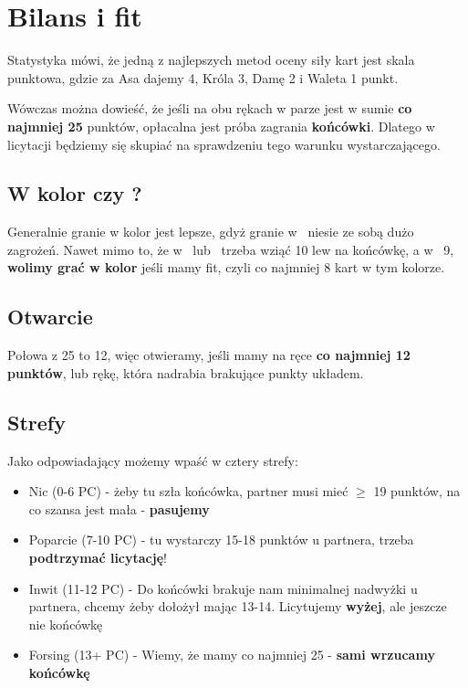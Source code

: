 \documentclass[12pt, a4paper]{article}
\begin{document}
    \pagebreak
    \section{Bilans i fit}

    Statystyka mówi, że jedną z najlepszych metod oceny siły kart jest skala punktowa,
    gdzie za Asa dajemy 4, Króla 3, Damę 2 i Waleta 1 punkt. 
    
    Wówczas można dowieść, że jeśli na obu rękach w parze jest w sumie \textbf{co najmniej 25} punktów,
    opłacalna jest próba zagrania \textbf{końcówki}. Dlatego w licytacji będziemy
    się skupiać na sprawdzeniu tego warunku wystarczającego.

    \subsection{W kolor czy \ntx?}
    Generalnie granie w kolor jest lepsze, gdyż granie w \nt\ niesie ze sobą dużo zagrożeń.
    Nawet mimo to, że w \hearts\ lub \spades\ trzeba wziąć 10 lew na końcówkę, a w \nt\ 9,
    \textbf{wolimy grać w kolor} jeśli mamy fit, czyli co najmniej 8 kart w tym kolorze.

    \subsection{Otwarcie}
    Połowa z 25 to 12, więc otwieramy, jeśli mamy na ręce \textbf{co najmniej 12 punktów},
    lub rękę, która nadrabia brakujące punkty układem.

    \subsection{Strefy}
    Jako odpowiadający możemy wpaść w cztery strefy:
    \begin{itemize}
        \item Nic (0-6 PC) - żeby tu szła końcówka, partner musi mieć $\geq$ 19 punktów,
        na co szansa jest mała - \textbf{pasujemy}
        \item Poparcie (7-10 PC) - tu wystarczy 15-18 punktów u partnera, trzeba \textbf{podtrzymać licytację}!
        \item Inwit (11-12 PC) - Do końcówki brakuje nam minimalnej nadwyżki u partnera, chcemy żeby dołożył
        mając 13-14. Licytujemy \textbf{wyżej}, ale jeszcze nie końcówkę
        \item Forsing (13+ PC) - Wiemy, że mamy co najmniej 25 - \textbf{sami wrzucamy końcówkę}
    \end{itemize}
\end{document}
